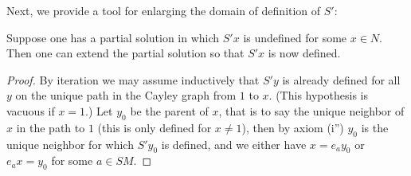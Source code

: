 Next, we provide a tool for enlarging the domain of definition of $S'$:

\begin{proposition}[Enlarging $S'$]\label{enlarge-S}  Suppose one has a partial solution in which $S'x$ is undefined for some $x \in N$.  Then one can extend the partial solution so that $S'x$ is now defined.
\end{proposition}

\begin{proof} By iteration we may assume inductively that $S'y$ is already defined for all $y$ on the unique path in the Cayley graph from $1$ to $x$.  (This hypothesis is vacuous if $x=1$.)  Let $y_0$ be the parent of $x$, that is to say the unique neighbor of $x$ in the path to $1$ (this is only defined for $x \neq 1$), then by axiom (i'') $y_0$ is the unique neighbor for which $S'y_0$ is defined, and we either have $x = e_a y_0$ or $e_a x = y_0$ for some $a \in SM$.


\end{proof}
